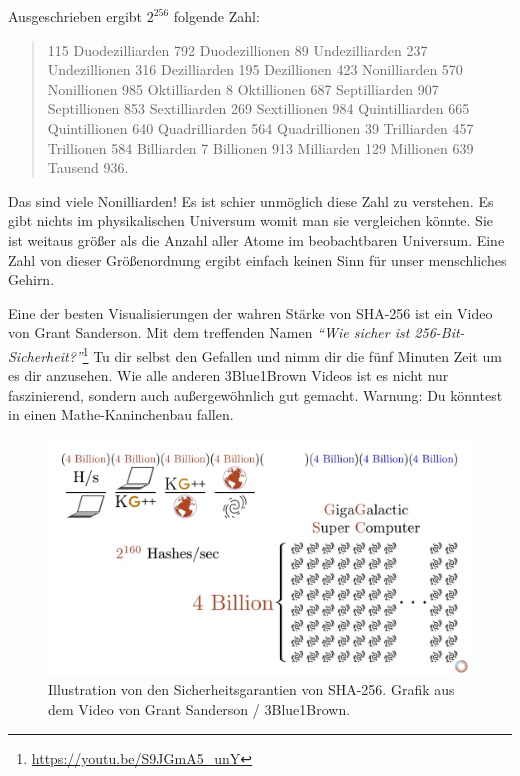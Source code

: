 Ausgeschrieben ergibt $2^{256}$ folgende Zahl:

\begin{quotation}\begin{samepage}
    115 Duodezilliarden 792 Duodezillionen 89 Undezilliarden 237 Undezillionen
    316 Dezilliarden 195 Dezillionen 423 Nonilliarden 570 Nonillionen 985
    Oktilliarden 8 Oktillionen 687 Septilliarden 907 Septillionen 853
    Sextilliarden 269 Sextillionen 984 Quintilliarden 665 Quintillionen 640
    Quadrilliarden 564 Quadrillionen 39 Trilliarden 457 Trillionen 584
    Billiarden 7 Billionen 913 Milliarden 129 Millionen 639 Tausend 936.
\end{samepage}\end{quotation}

Das sind viele Nonilliarden! Es ist schier unmöglich diese Zahl zu verstehen. Es
gibt nichts im physikalischen Universum womit man sie vergleichen könnte. Sie
ist weitaus größer als die Anzahl aller Atome im beobachtbaren Universum. Eine
Zahl von dieser Größenordnung ergibt einfach keinen Sinn für unser menschliches
Gehirn.

Eine der besten Visualisierungen der wahren Stärke von SHA-256 ist ein  Video
von Grant Sanderson. Mit dem treffenden Namen \textit{\enquote{Wie sicher ist
256-Bit-Sicherheit?}}\footnote{\url{https://youtu.be/S9JGmA5_unY}} Tu dir selbst
den Gefallen und nimm dir die fünf Minuten Zeit um es dir anzusehen. Wie alle
anderen 3Blue1Brown Videos ist es nicht nur faszinierend, sondern auch
außergewöhnlich gut gemacht. Warnung: Du könntest in einen Mathe-Kaninchenbau
fallen.

\begin{figure}
  \includegraphics{assets/images/youtube-vid-inverted.png}
  \caption{Illustration von den Sicherheitsgarantien von SHA-256. Grafik aus dem Video von Grant Sanderson / 3Blue1Brown.}
  \label{fig:youtube-vid-inverted}
\end{figure}

